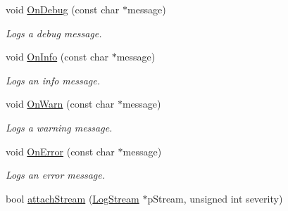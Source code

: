 \begin{DoxyCompactItemize}
\item 
\hypertarget{class_assimp_1_1_null_logger_af354ebbd382b7097a55d364794a45631}{void \hyperlink{class_assimp_1_1_null_logger_af354ebbd382b7097a55d364794a45631}{On\-Debug} (const char $\ast$message)}\label{class_assimp_1_1_null_logger_af354ebbd382b7097a55d364794a45631}

\begin{DoxyCompactList}\small\item\em Logs a debug message. \end{DoxyCompactList}\item 
\hypertarget{class_assimp_1_1_null_logger_a12d2b0048d17a819c8c00277ad1394c5}{void \hyperlink{class_assimp_1_1_null_logger_a12d2b0048d17a819c8c00277ad1394c5}{On\-Info} (const char $\ast$message)}\label{class_assimp_1_1_null_logger_a12d2b0048d17a819c8c00277ad1394c5}

\begin{DoxyCompactList}\small\item\em Logs an info message. \end{DoxyCompactList}\item 
\hypertarget{class_assimp_1_1_null_logger_a9a04c2b9e3d4bc9eec8f693ed8115f24}{void \hyperlink{class_assimp_1_1_null_logger_a9a04c2b9e3d4bc9eec8f693ed8115f24}{On\-Warn} (const char $\ast$message)}\label{class_assimp_1_1_null_logger_a9a04c2b9e3d4bc9eec8f693ed8115f24}

\begin{DoxyCompactList}\small\item\em Logs a warning message. \end{DoxyCompactList}\item 
\hypertarget{class_assimp_1_1_null_logger_a4fbf66103757fafcff891fb04b4ee714}{void \hyperlink{class_assimp_1_1_null_logger_a4fbf66103757fafcff891fb04b4ee714}{On\-Error} (const char $\ast$message)}\label{class_assimp_1_1_null_logger_a4fbf66103757fafcff891fb04b4ee714}

\begin{DoxyCompactList}\small\item\em Logs an error message. \end{DoxyCompactList}\item 
\hypertarget{class_assimp_1_1_null_logger_a31c05ecaee392b5fd34fd2dfd1cca559}{bool \hyperlink{class_assimp_1_1_null_logger_a31c05ecaee392b5fd34fd2dfd1cca559}{attach\-Stream} (\hyperlink{class_assimp_1_1_log_stream}{Log\-Stream} $\ast$p\-Stream, unsigned int severity)}\label{class_assimp_1_1_null_logger_a31c05ecaee392b5fd34fd2dfd1cca559}


\end{DoxyCompactItemize}
